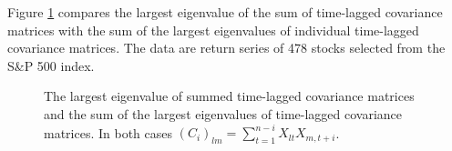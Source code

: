 \documentclass[11pt,reqno]{amsart}
\newcommand{\1}{\mathds{1}}
\newcommand{\0}{\boldsymbol{0}}
\newcommand{\4}{\mathchoice{\mskip1.5mu}{\mskip1.5mu}{}{}}
\newcommand{\5}{\mathchoice{\mskip-1.5mu}{\mskip-1.5mu}{}{}}
\newcommand{\2}{\penalty250\mskip\thickmuskip\mskip-\thinmuskip} %
\begin{document}
\newpage
Figure \ref{fig:LamYao} compares the largest eigenvalue of the sum of
time-lagged covariance matrices with the sum of the largest
eigenvalues of individual time-lagged covariance matrices. The data
are return series of 478 stocks selected from the S\&P 500 index.
\begin{figure}[htb!]
  \centering
  \caption{The largest eigenvalue of summed time-lagged covariance
    matrices and the sum of the largest eigenvalues of time-lagged
    covariance matrices. In both cases $(C_i)_{lm} =
    \sum_{t=1}^{n-i} X_{lt} X_{m,t+i}$.}
  \label{fig:LamYao}
\end{figure}
\end{document}
